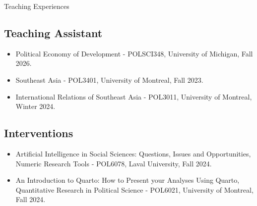 \documentclass{resume} %
\begin{document}
\begin{rSection}{Teaching Experiences}
	\subsection*{Teaching Assistant}
	\begin{itemize}
		\item[-] Political Economy of Development - POLSCI348, University of Michigan, Fall 2026.
		\item[-] Southeast Asia - POL3401, University of Montreal, Fall 2023.
		\item[-] International Relations of Southeast Asia - POL3011, University of Montreal, Winter 2024.
	\end{itemize}
	\subsection*{Interventions}
	\begin{itemize}
		\item[-] Artificial Intelligence in Social Sciences: Questions, Issues and Opportunities, Numeric Research Tools - POL6078, Laval University, Fall 2024.
		\item[-] An Introduction to Quarto: How to Present your Analyses Using Quarto, Quantitative Research in Political Science - POL6021, University of Montreal, Fall 2024.
	\end{itemize}

\end{rSection}
\end{document}
